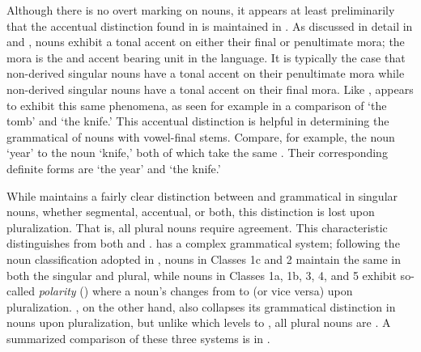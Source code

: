 \documentclass[output=paper,modfonts,nonflat,
hidelinks
]{langsci/langscibook}
\begin{document}
Although there is no overt  marking on  nouns, it appears at least preliminarily that the accentual  distinction found in  is maintained in . As discussed in detail in \citet{Hyman1981somali} and \citet{GreenMorrison2016},  nouns exhibit a tonal accent on either their final or penultimate mora; the mora is the  and accent bearing unit in the language. It is typically the case that non-derived  singular nouns have a tonal accent on their penultimate mora while non-derived  singular nouns have a tonal accent on their final mora. Like ,  appears to exhibit this same phenomena, as seen for example in a comparison of   `the tomb' and   `the knife.' This accentual distinction is helpful in determining the grammatical  of nouns with vowel-final stems. Compare, for example, the  noun  `year' to the  noun  `knife,' both of which take the same  . Their corresponding definite forms are  `the year' and  `the knife.'
  
While  maintains a fairly clear distinction between  and  grammatical  in singular nouns, whether segmental, accentual, or both, this distinction is lost upon pluralization. That is, all plural nouns require   agreement. This characteristic distinguishes  from both  and .  has a complex grammatical  system; following the noun classification adopted in \citet{Greenetal2015}, nouns in Classes 1c and 2 maintain the same  in both the singular and plural, while nouns in Classes 1a, 1b, 3, 4, and 5 exhibit so-called \textit{ polarity} (\citealt{Meinhof1912}) where a noun's  changes from  to  (or vice versa) upon pluralization. , on the other hand, also collapses its grammatical  distinction in nouns upon pluralization, but unlike  which levels  to , all  plural nouns are . A summarized comparison of these three systems is in . 
 
\end{document}
